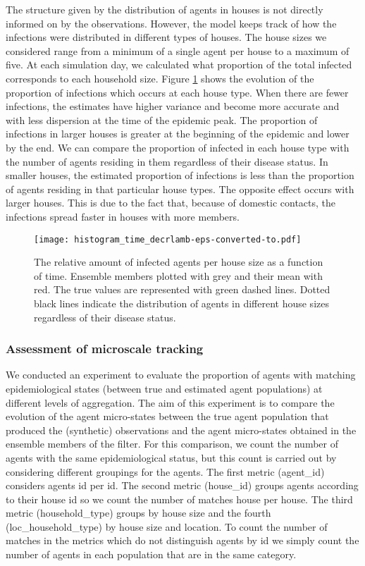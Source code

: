 \documentclass[11pt,a4paper]{article}
\begin{document}
The structure given by the distribution of agents in houses is not directly informed on by the observations. However, the model keeps track of how the infections were distributed in different types of houses. The house sizes we considered range from a minimum of a single agent per house to a maximum of five. At each simulation day, we calculated what proportion of the total infected corresponds to each household size. Figure \ref{fig:time_histograms} shows the evolution of the proportion of infections which occurs at each house type. When there are fewer infections, the estimates have higher variance and become more accurate and with less dispersion at the time of the epidemic peak. The proportion of infections in larger houses is greater at the beginning of the epidemic and lower by the end. We can compare the proportion of infected in each house type with the number of agents residing in them regardless of their disease status. In smaller houses, the estimated proportion of infections is less than the proportion of agents residing in that particular house types. The opposite effect occurs with larger houses. This is due to the fact that, because of domestic contacts, the infections spread faster in houses with more members. 

\begin{figure}
    \captionsetup{width=0.5\textwidth}
    \centering
    \texttt{[image: histogram\_time\_decrlamb-eps-converted-to.pdf]}
    \caption{The relative amount of infected agents per house size as a function of time. Ensemble members plotted with grey and their mean with red. The true values are represented with green dashed lines. Dotted black lines indicate the distribution of agents in different house sizes regardless of their disease status.}
    \label{fig:time_histograms}
\end{figure}

\subsubsection{Assessment of microscale tracking}

We conducted an experiment to evaluate the proportion of agents with matching epidemiological states (between true and estimated agent populations) at different levels of aggregation. The aim of this experiment is to compare the evolution of the agent micro-states between the true agent population that produced the (synthetic) observations and the agent micro-states obtained in the ensemble members of the filter. For this comparison, we count the number of agents with the same epidemiological status, but this count is carried out by considering different groupings for the agents. The first metric (agent\_id) considers agents id per id. The second metric (house\_id) groups agents according to their house id so we count the number of matches house per house. The third metric (household\_type) groups by house size and the fourth (loc\_household\_type) by house size and location. To count the number of matches in the metrics which do not distinguish agents by id we simply count the number of agents in each population that are in the same category.
\end{document}

